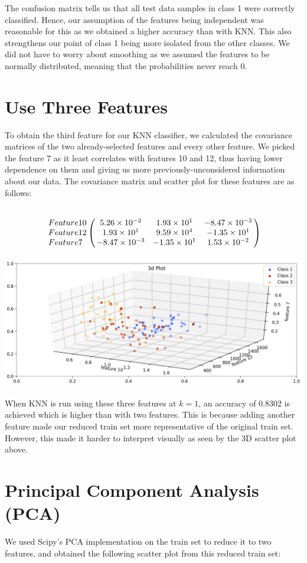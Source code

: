 \documentclass[11pt]{article}
\begin{document}
The confusion matrix tells us that all test data samples in class 1 were correctly classified. Hence, our assumption of the features being independent was reasonable for this as we obtained a higher accuracy than with KNN. This also strengthens our point of class 1 being more isolated from the other classes. We did not have to worry about smoothing as we assumed the features to be normally distributed, meaning that the probabilities never reach 0.

\section{Use Three Features}
To obtain the third feature for our KNN classifier, we calculated the covariance matrices of the two already-selected features and every other feature. We picked the feature 7 as it least correlates with features 10 and 12, thus having lower dependence on them and giving us more previously-unconsidered information about our data. The covariance matrix and scatter plot for these features are as follows:

$$
\bordermatrix{ ~ & ~ & ~ & ~ \cr
Feature 10 & 5.26\times10^{-2} & 1.93\times10^1 & -8.47\times10^{-3} \cr
Feature 12 & 1.93\times10^1 & 9.59\times10^4 & -1.35\times10^1 \cr
Feature 7 & -8.47\times10^{-3} & -1.35\times10^1 & 1.53\times10^{-2} \cr}
$$

\begin{center}
\includegraphics[scale=0.3]{3d_plot_2}
\end{center}

When KNN is run using these three features at $k = 1$, an accuracy of 0.8302 is achieved which is higher than with two features. This is because adding another feature made our reduced train set more representative of the original train set. However, this made it harder to interpret visually as seen by the 3D scatter plot above.

\section{Principal Component Analysis (PCA)}
We used Scipy's PCA implementation on the train set to reduce it to two features, and obtained the following scatter plot from this reduced train set:
\end{document}
